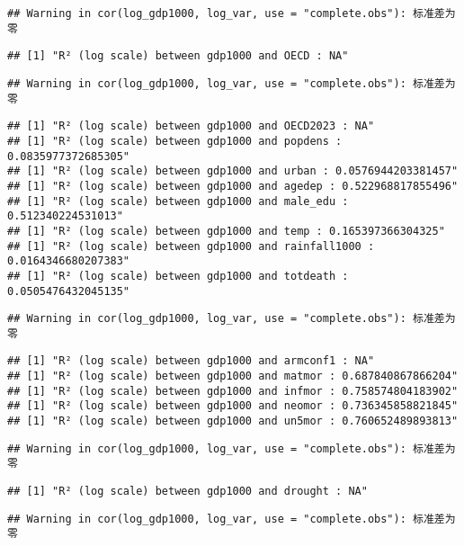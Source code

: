 \documentclass[
]{article}
\begin{document}
\begin{verbatim}
## Warning in cor(log_gdp1000, log_var, use = "complete.obs"): 标准差为零
\end{verbatim}

\begin{verbatim}
## [1] "R² (log scale) between gdp1000 and OECD : NA"
\end{verbatim}

\begin{verbatim}
## Warning in cor(log_gdp1000, log_var, use = "complete.obs"): 标准差为零
\end{verbatim}

\begin{verbatim}
## [1] "R² (log scale) between gdp1000 and OECD2023 : NA"
## [1] "R² (log scale) between gdp1000 and popdens : 0.0835977372685305"
## [1] "R² (log scale) between gdp1000 and urban : 0.0576944203381457"
## [1] "R² (log scale) between gdp1000 and agedep : 0.522968817855496"
## [1] "R² (log scale) between gdp1000 and male_edu : 0.512340224531013"
## [1] "R² (log scale) between gdp1000 and temp : 0.165397366304325"
## [1] "R² (log scale) between gdp1000 and rainfall1000 : 0.0164346680207383"
## [1] "R² (log scale) between gdp1000 and totdeath : 0.0505476432045135"
\end{verbatim}

\begin{verbatim}
## Warning in cor(log_gdp1000, log_var, use = "complete.obs"): 标准差为零
\end{verbatim}

\begin{verbatim}
## [1] "R² (log scale) between gdp1000 and armconf1 : NA"
## [1] "R² (log scale) between gdp1000 and matmor : 0.687840867866204"
## [1] "R² (log scale) between gdp1000 and infmor : 0.758574804183902"
## [1] "R² (log scale) between gdp1000 and neomor : 0.736345858821845"
## [1] "R² (log scale) between gdp1000 and un5mor : 0.760652489893813"
\end{verbatim}

\begin{verbatim}
## Warning in cor(log_gdp1000, log_var, use = "complete.obs"): 标准差为零
\end{verbatim}

\begin{verbatim}
## [1] "R² (log scale) between gdp1000 and drought : NA"
\end{verbatim}

\begin{verbatim}
## Warning in cor(log_gdp1000, log_var, use = "complete.obs"): 标准差为零
\end{verbatim}
\end{document}
